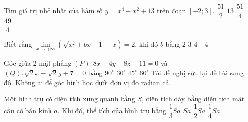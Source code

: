 \begin{ex}%
Tìm giá trị nhỏ nhất của hàm số $y = x^4 - x^2 + 13$ trên đoạn $[-2; 3]$. 
	\choice
	{$\dfrac{51}{2}$}
	{$13$}
	{\True $\dfrac{51}{4}$}
	{$\dfrac{49}{4}$}
\end{ex}

\begin{ex}%
	Biết rằng $\lim\limits_{x \rightarrow + \infty} (\sqrt{x^2 + bx + 1} - x) = 2$, khi đó $b$ bằng
	\choice
	{$2$}
	{$3$}
	{\True $4$}
	{$-4$}
\end{ex}

\begin{ex}%
Góc giữa 2 mặt phẳng $(P) \colon 8x - 4y -8z-11 = 0$ và $(Q) \colon \sqrt{2}x - \sqrt{2}y + 7 = 0$ bằng
\choice
	{$90^\circ$}
	{$30^\circ$}
	{\True $45^\circ$}
	{$60^\circ$}
Tôi đề nghị sửa lại đề bài sang độ. Không ai để góc hình học dưới đơn vị đo radian cả. 
\end{ex}

\begin{ex}%
Một hình trụ có diện tích xung quanh bằng $S$, diện tích đáy bằng diện tích mặt cầu có bán kính $a$. Khi đó, thể tích của hình trụ bằng 
	\choice
	{$\dfrac{1}{3} Sa$}
	{$Sa$}
	{\True $\dfrac{1}{2} Sa$}
	{$\dfrac{1}{4} Sa$}
\end{ex}

